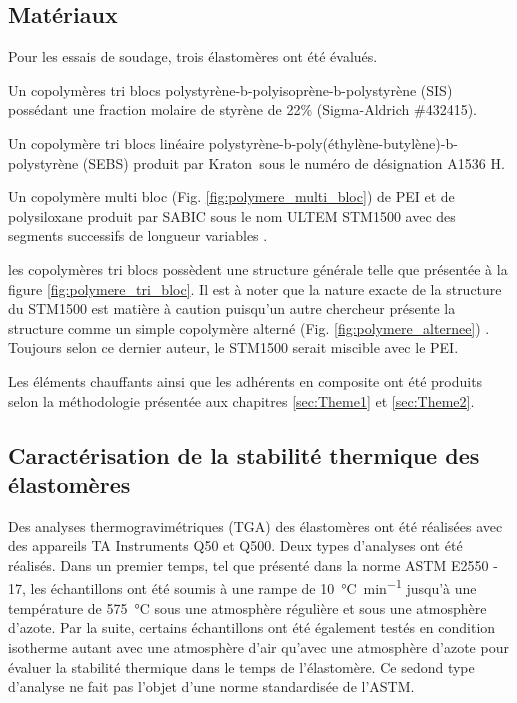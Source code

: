\subsection{Matériaux}

Pour les essais de soudage, trois élastomères ont été évalués. 
\begin{inparaenum}[]
	\item Un copolymères tri blocs polystyrène-b-polyisoprène-b-polystyrène (SIS) possédant une fraction molaire de styrène de 22\% (Sigma-Aldrich \#432415). 
	\item Un copolymère tri blocs linéaire polystyrène-b-poly(éthylène-butylène)-b-polystyrène (SEBS) produit par Kraton\textregistered \ sous le numéro de désignation A1536 H. 
	\item Un copolymère multi bloc (Fig. \ref{fig:polymere_multi_bloc}) de PEI et de polysiloxane produit par SABIC sous le nom ULTEM STM1500 avec des segments successifs de longueur variables  \cite{mark2013,Holden2002}. 
\end{inparaenum}
les copolymères tri blocs possèdent une structure générale telle que présentée à la figure \ref{fig:polymere_tri_bloc}. 
Il est à noter que la nature exacte de la structure du STM1500 est matière à caution puisqu'un autre chercheur présente la structure comme un simple copolymère alterné (Fig. \ref{fig:polymere_alternee}) \cite{Hatui2015}. 
Toujours selon ce dernier auteur, le STM1500 serait miscible avec le PEI. 

Les éléments chauffants ainsi que les adhérents en composite ont été produits selon la méthodologie présentée aux chapitres \ref{sec:Theme1} et \ref{sec:Theme2}. 

\subsection{Caractérisation de la stabilité thermique des élastomères}

Des analyses thermogravimétriques (TGA) des élastomères ont été réalisées avec des appareils TA Instruments Q50 et Q500. 
Deux types d'analyses ont été réalisés. 
Dans un premier temps, tel que présenté dans la norme ASTM E2550 - 17, les échantillons ont été soumis à une rampe de \SI{10}{\celsius\per\minute} jusqu'à une température de \SI{575}{\celsius} sous une atmosphère régulière et sous une atmosphère d'azote. 
Par la suite, certains échantillons ont été également testés en condition isotherme autant avec une atmosphère d'air qu'avec une atmosphère d'azote pour évaluer la stabilité thermique dans le temps de l'élastomère. 
Ce sedond type d'analyse ne fait pas l'objet d'une norme standardisée de l'ASTM. 

